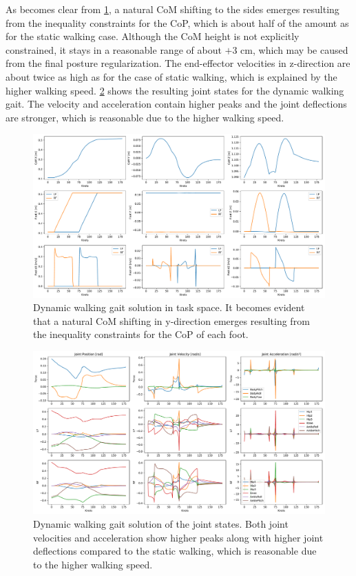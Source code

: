As becomes clear from \cref{fig:walkDynamic_TaskSpace}, a natural \gls{CoM} shifting to the sides emerges resulting from the inequality constraints for the \gls{CoP}, which is about half of the amount as for the static walking case. Although the \gls{CoM} height is not explicitly constrained, it stays in a reasonable range of about $+$3 cm, which may be caused from the final posture regularization. The end-effector velocities in z-direction are about twice as high as for the case of static walking, which is explained by the higher walking speed. 
\cref{fig:walkDynamic_JointState} shows the resulting joint states for the dynamic walking gait. The velocity and acceleration contain higher peaks and the joint deflections are stronger, which is reasonable due to the higher walking speed.       

\begin{figure}[h!]
\centering	
\includegraphics[width=.9\textwidth]{fig/walkDynamic/TaskSpace}
\caption[Dynamic walking gait solution in task space]{Dynamic walking gait solution in task space. It becomes evident that a natural \gls{CoM} shifting in y-direction emerges resulting from the inequality constraints for the \gls{CoP} of each foot.}
\label{fig:walkDynamic_TaskSpace}
\end{figure} 

\begin{figure}[h!]
\centering	
\includegraphics[width=.9\textwidth]{fig/walkDynamic/JointState}
\caption[Dynamic walking gait solution of the joint states.]{Dynamic walking gait solution of the joint states. Both joint velocities and acceleration show higher peaks along with higher joint deflections compared to the static walking, which is reasonable due to the higher walking speed.}
\label{fig:walkDynamic_JointState}
\end{figure} 

